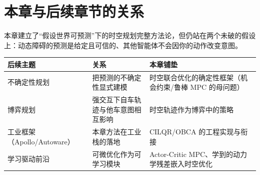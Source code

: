 \section*{本章与后续章节的关系}
本章建立了“假设世界可预测”下的时空规划完整方法论，但仍站在两个未破的假设上：动态障碍的预测是给定且可信的、其他智能体不会因你的动作改变意图。
\begin{table}[H]\centering\small
\begin{tabular}{lll}
\toprule
后续主题 & 关系 & 本章铺垫 \\
\midrule
不确定性规划 & 把预测的不确定性显式建模 & 时空联合优化的确定性框架（机会约束/鲁棒 MPC 的母问题） \\
博弈规划 & 强交互下自车轨迹与他车意图相互影响 & 时空轨迹作为博弈中的策略 \\
工业框架（Apollo/Autoware） & 本章方法在工业栈的落地 & CILQR/OBCA 的工程实现与衔接 \\
学习驱动前沿 & 可微优化作为可学习模块 & Actor-Critic MPC、学到的动力学残差嵌入时空优化 \\
\bottomrule
\end{tabular}
\end{table}

